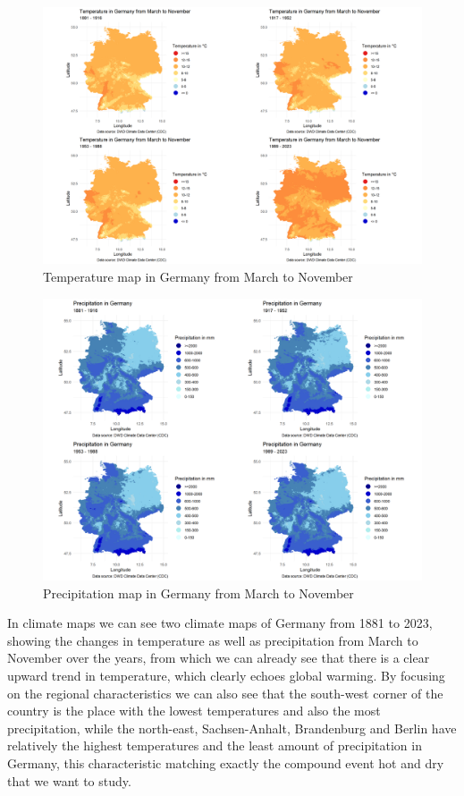 \documentclass[
]{krantz}
\begin{document}
\begin{figure}

{\centering \includegraphics[width=0.8\linewidth]{work/03-compounds/figures/Temperature/Temperature} 

}

\caption{Temperature map in Germany from March to November}\label{fig:climatemap3-shiyu}
\end{figure}

\begin{figure}

{\centering \includegraphics[width=0.8\linewidth]{work/03-compounds/figures/Precipitation/Precipitation} 

}

\caption{Precipitation map in Germany from March to November}\label{fig:climatemap4-shiyu}
\end{figure}

In climate maps we can see two climate maps of Germany from 1881 to 2023, showing the changes in temperature as well as precipitation from March to November over the years, from which we can already see that there is a clear upward trend in temperature, which clearly echoes global warming. By focusing on the regional characteristics we can also see that the south-west corner of the country is the place with the lowest temperatures and also the most precipitation, while the north-east, Sachsen-Anhalt, Brandenburg and Berlin have relatively the highest temperatures and the least amount of precipitation in Germany, this characteristic matching exactly the compound event hot and dry that we want to study.
\end{document}
